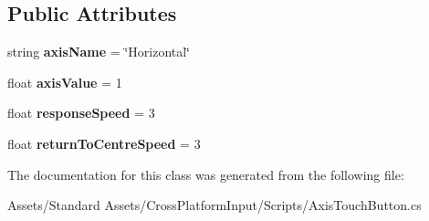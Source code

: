 \subsection*{Public Attributes}
\begin{DoxyCompactItemize}
\item 
string {\bfseries axis\+Name} = \char`\"{}Horizontal\char`\"{}\hypertarget{class_unity_standard_assets_1_1_cross_platform_input_1_1_axis_touch_button_aa45ba9cf0514e4e7b6746b5d6cd8d6cc}{}\label{class_unity_standard_assets_1_1_cross_platform_input_1_1_axis_touch_button_aa45ba9cf0514e4e7b6746b5d6cd8d6cc}

\item 
float {\bfseries axis\+Value} = 1\hypertarget{class_unity_standard_assets_1_1_cross_platform_input_1_1_axis_touch_button_ac90b2628193b482537c30818f236c8e8}{}\label{class_unity_standard_assets_1_1_cross_platform_input_1_1_axis_touch_button_ac90b2628193b482537c30818f236c8e8}

\item 
float {\bfseries response\+Speed} = 3\hypertarget{class_unity_standard_assets_1_1_cross_platform_input_1_1_axis_touch_button_adf1bf30668ea4383040d07ebb00fb373}{}\label{class_unity_standard_assets_1_1_cross_platform_input_1_1_axis_touch_button_adf1bf30668ea4383040d07ebb00fb373}

\item 
float {\bfseries return\+To\+Centre\+Speed} = 3\hypertarget{class_unity_standard_assets_1_1_cross_platform_input_1_1_axis_touch_button_a2a194c4af2b74c29b5388c9e0bffd4f5}{}\label{class_unity_standard_assets_1_1_cross_platform_input_1_1_axis_touch_button_a2a194c4af2b74c29b5388c9e0bffd4f5}

\end{DoxyCompactItemize}


The documentation for this class was generated from the following file\+:\begin{DoxyCompactItemize}
\item 
Assets/\+Standard Assets/\+Cross\+Platform\+Input/\+Scripts/Axis\+Touch\+Button.\+cs\end{DoxyCompactItemize}
